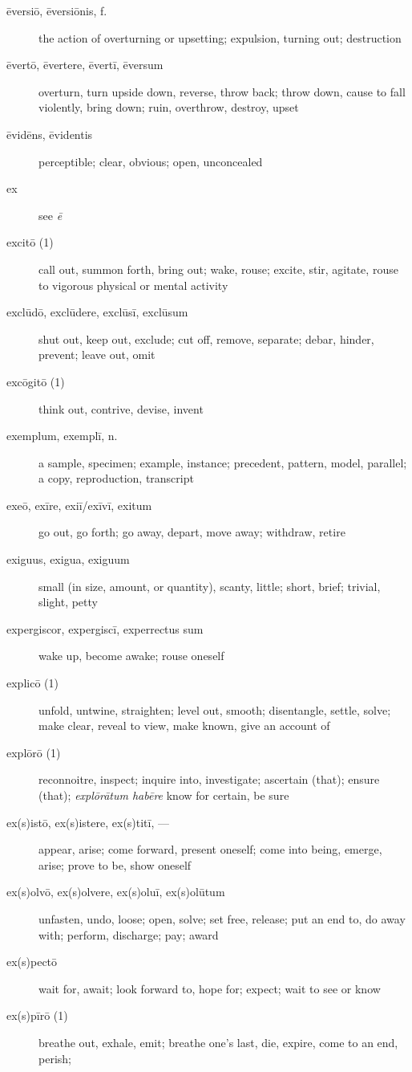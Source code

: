 \begin{description}
    \item[ēversiō, ēversiōnis, f.] the action of overturning or upsetting; expulsion, turning out; destruction
    \item[ēvertō, ēvertere, ēvertī, ēversum] overturn, turn upside down, reverse, throw back; throw down, cause to fall violently, bring down; ruin, overthrow, destroy, upset
    \item[ēvidēns, ēvidentis] perceptible; clear, obvious; open, unconcealed
    \item[ex] see \textit{ē}
    \item[excitō (1)] call out, summon forth, bring out; wake, rouse; excite, stir, agitate, rouse to vigorous physical or mental activity
    \item[exclūdō, exclūdere, exclūsī, exclūsum] shut out, keep out, exclude; cut off, remove, separate; debar, hinder, prevent; leave out, omit
    \item[excōgitō (1)] think out, contrive, devise, invent
    \item[exemplum, exemplī, n.] a sample, specimen; example, instance; precedent, pattern, model, parallel; a copy, reproduction, transcript
    \item[exeō, exīre, exiī/exīvī, exitum] go out, go forth; go away, depart, move away; withdraw, retire
    \item[exiguus, exigua, exiguum] small (in size, amount, or quantity), scanty, little; short, brief; trivial, slight, petty
    \item[expergiscor, expergiscī, experrectus sum] wake up, become awake; rouse oneself
    \item[explicō (1)] unfold, untwine, straighten; level out, smooth; disentangle, settle, solve; make clear, reveal to view, make known, give an account of
    \item[explōrō (1)] reconnoitre, inspect; inquire into, investigate; ascertain (that); ensure (that); \textit{explōrātum habēre} know for certain, be sure
    \item[ex(s)istō, ex(s)istere, ex(s)titī, ---] appear, arise; come forward, present oneself; come into being, emerge, arise; prove to be, show oneself
    \item[ex(s)olvō, ex(s)olvere, ex(s)oluī, ex(s)olūtum] unfasten, undo, loose; open, solve; set free, release; put an end to, do away with; perform, discharge; pay; award
    \item[ex(s)pectō] wait for, await; look forward to, hope for; expect; wait to see or know
    \item[ex(s)pīrō (1)] breathe out, exhale, emit; breathe one's last, die, expire, come to an end, perish;

\end{description}
